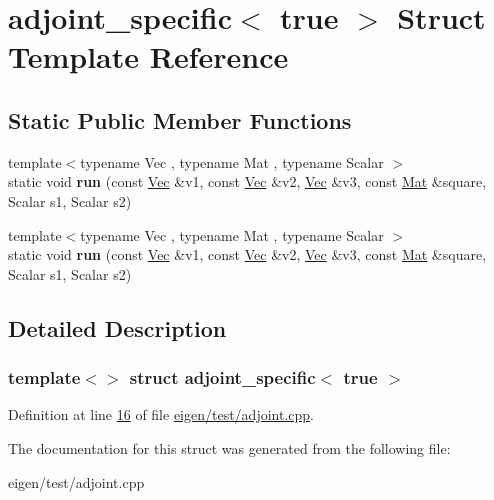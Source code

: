\hypertarget{structadjoint__specific_3_01true_01_4}{}\section{adjoint\+\_\+specific$<$ true $>$ Struct Template Reference}
\label{structadjoint__specific_3_01true_01_4}
\subsection*{Static Public Member Functions}
\begin{DoxyCompactItemize}
\item 
\mbox{\label{structadjoint__specific_3_01true_01_4_a597e51854bab5593ae98b56718ac1b84}} 
{\footnotesize template$<$typename Vec , typename Mat , typename Scalar $>$ }\\static void {\bfseries run} (const \hyperlink{group___core___module_class_eigen_1_1_matrix}{Vec} \&v1, const \hyperlink{group___core___module_class_eigen_1_1_matrix}{Vec} \&v2, \hyperlink{group___core___module_class_eigen_1_1_matrix}{Vec} \&v3, const \hyperlink{group___core___module}{Mat} \&square, Scalar s1, Scalar s2)
\item 
\mbox{\label{structadjoint__specific_3_01true_01_4_a597e51854bab5593ae98b56718ac1b84}} 
{\footnotesize template$<$typename Vec , typename Mat , typename Scalar $>$ }\\static void {\bfseries run} (const \hyperlink{group___core___module_class_eigen_1_1_matrix}{Vec} \&v1, const \hyperlink{group___core___module_class_eigen_1_1_matrix}{Vec} \&v2, \hyperlink{group___core___module_class_eigen_1_1_matrix}{Vec} \&v3, const \hyperlink{group___core___module}{Mat} \&square, Scalar s1, Scalar s2)
\end{DoxyCompactItemize}


\subsection{Detailed Description}
\subsubsection*{template$<$$>$\newline
struct adjoint\+\_\+specific$<$ true $>$}



Definition at line \hyperlink{eigen_2test_2adjoint_8cpp_source_l00016}{16} of file \hyperlink{eigen_2test_2adjoint_8cpp_source}{eigen/test/adjoint.\+cpp}.



The documentation for this struct was generated from the following file\+:\begin{DoxyCompactItemize}
\item 
eigen/test/adjoint.\+cpp\end{DoxyCompactItemize}
